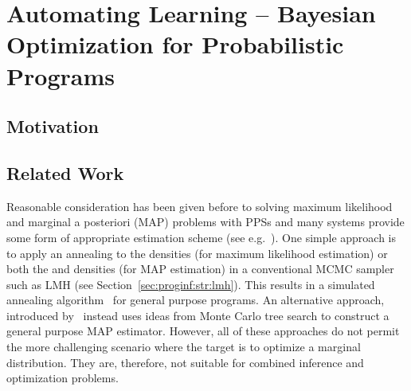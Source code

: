 %

\chapter{Automating Learning -- Bayesian Optimization for Probabilistic Programs}
\label{chp:bopp}



\section{Motivation} 
\label{sec:IntroductionBOPP}



\section{Related Work} 
\label{sec:bopp:related}

Reasonable consideration has been given before to solving maximum likelihood and marginal 
a posteriori (MAP) problems with PPSs and many systems provide some form of appropriate
estimation scheme (see e.g.~\citep{goodman_book_2014,carpenter2015stan,salvatier2016probabilistic}).  One simple
approach is to apply an annealing to the \observe densities (for maximum likelihood estimation)
or both the \sample and \observe densities (for MAP estimation) in
a conventional MCMC sampler such as LMH (see Section~\ref{sec:proginf:str:lmh}).
This results in a simulated annealing algorithm~\citep{aarts1988simulated} for general purpose programs.
An alternative approach, introduced by~\cite{tolpin-socs-2015}
instead uses ideas from Monte Carlo tree search to construct a general purpose MAP estimator.
However, all of these approaches do not permit the more challenging scenario
where the target is to optimize a marginal distribution.  They are, therefore, not suitable for combined
inference and optimization problems.

